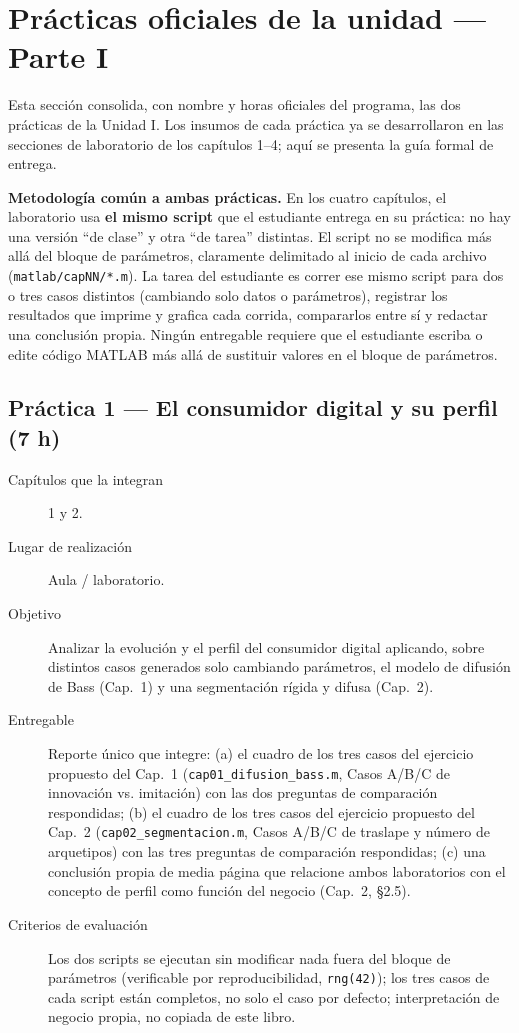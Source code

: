 \chapter*{Prácticas oficiales de la unidad — Parte I}

Esta sección consolida, con nombre y horas oficiales del programa, las dos
prácticas de la Unidad I. Los insumos de cada práctica ya se desarrollaron
en las secciones de laboratorio de los capítulos 1--4; aquí se presenta la
guía formal de entrega.

\textbf{Metodología común a ambas prácticas.} En los cuatro capítulos, el
laboratorio usa \textbf{el mismo script} que el estudiante entrega en su
práctica: no hay una versión \enquote{de clase} y otra \enquote{de tarea}
distintas. El script no se modifica más allá del bloque de parámetros,
claramente delimitado al inicio de cada archivo (\texttt{matlab/capNN/*.m}).
La tarea del estudiante es correr ese mismo script para dos o tres casos
distintos (cambiando solo datos o parámetros), registrar los resultados que
imprime y grafica cada corrida, compararlos entre sí y redactar una
conclusión propia. Ningún entregable requiere que el estudiante escriba o
edite código MATLAB más allá de sustituir valores en el bloque de
parámetros.

\section*{Práctica 1 — El consumidor digital y su perfil (7 h)}

\begin{description}
  \item[Capítulos que la integran] 1 y 2.
  \item[Lugar de realización] Aula / laboratorio.
  \item[Objetivo] Analizar la evolución y el perfil del consumidor digital
  aplicando, sobre distintos casos generados solo cambiando parámetros, el
  modelo de difusión de Bass (Cap.~1) y una segmentación rígida y difusa
  (Cap.~2).
  \item[Entregable] Reporte único que integre: (a) el cuadro de los tres
  casos del ejercicio propuesto del Cap.~1 (\texttt{cap01\_difusion\_bass.m},
  Casos A/B/C de innovación vs. imitación) con las dos preguntas de
  comparación respondidas; (b) el cuadro de los tres casos del ejercicio
  propuesto del Cap.~2 (\texttt{cap02\_segmentacion.m}, Casos A/B/C de
  traslape y número de arquetipos) con las tres preguntas de comparación
  respondidas; (c) una conclusión propia de media página que relacione ambos
  laboratorios con el concepto de perfil como función del negocio (Cap.~2,
  §2.5).
  \item[Criterios de evaluación] Los dos scripts se ejecutan sin modificar
  nada fuera del bloque de parámetros (verificable por reproducibilidad,
  \texttt{rng(42)}); los tres casos de cada script están completos, no solo
  el caso por defecto; interpretación de negocio propia, no copiada de este
  libro.
\end{description}

